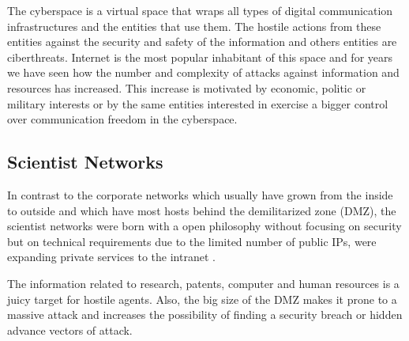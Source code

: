 \documentclass[a4paper]{llncs}
\begin{document}
The cyberspace is a virtual space that wraps all types of digital
communication  infrastructures and the entities that use them. The hostile actions from these entities against the security and safety of the information and others entities are ciberthreats. Internet is the most popular inhabitant of this space and for years we have seen how
the number and complexity of attacks against information and resources has increased. This increase is motivated by  economic, politic or military interests or by the same entities interested in exercise a bigger control over communication freedom in the cyberspace\cite{cni-ccn-tendencias-2014,cni-ccn-tendencias-2015}.
\subsection{Scientist Networks}
\label{sect:Scientist Networks}
In contrast to the corporate networks which usually have grown from
the inside to outside %
and which have most hosts behind the demilitarized
zone (DMZ), %
the scientist networks were born with a open philosophy without focusing on security but on technical requirements due to the limited number of public IPs, were expanding private services to the intranet \cite{iris-proyecto}.

The information related to research, patents, computer and human resources is a juicy target for hostile agents. Also, the big size of the DMZ %
 makes it prone to a massive attack and increases the possibility of finding a security breach or hidden advance vectors of attack.
\end{document}
